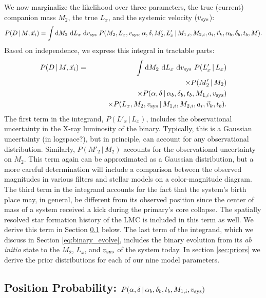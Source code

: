 \documentclass[12pt, preprint]{aastex}
\newcommand{\given}{\,|\,}
\newcommand{\dd}{\mathrm{d}}
\begin{document}
We now marginalize the likelihood over three parameters, the true (current) companion mass $M_2$, the true $L_x$, and the systemic velocity ($v_{\rm sys}$):
\begin{equation}
P(D \given M, \vec{x}_i) =  \int \dd M_2\ \dd L_x\ \dd v_{\rm sys}\ P( M_2, L_x, v_{\rm sys}, \alpha, \delta, M'_2, L'_x \given M_{1,i}, M_{2,i}, a_i, \vec{v}_k, \alpha_b, \delta_b, t_b, M).
\end{equation}
Based on independence, we express this integral in tractable parts:
\begin{eqnarray}
P(D \given M, \vec{x}_i) &=&  \int \dd M_2\ \dd L_x\ \dd v_{\rm sys}\ P(L'_x \given L_x) \nonumber \\
	& & \qquad \times P(M'_2 \given M_2) \nonumber \\
	& & \qquad \times P(\alpha, \delta \given \alpha_b, \delta_b, t_b, M_{1,i}, v_{\rm sys}) \nonumber \\
	& & \qquad \times P(L_x, M_2, v_{\rm sys} \given M_{1,i}, M_{2,i}, a_i, \vec{v}_k, t_b). \label{eq:marginalized}
\end{eqnarray}
The first term in the integrand, $P(L'_x \given L_x)$, includes the observational uncertainty in the X-ray luminosity of the binary. Typically, this is a Gaussian uncertainty (in logspace?), but in principle, can account for any observational distribution. Similarly, $P(M'_2 \given M_2)$ accounts for the observational uncertainty on $M_2$. This term again can be approximated as a Gaussian distribution, but a more careful determination will include a comparison between the observed magnitudes in various filters and stellar models on a color-magnitude diagram. The third term in the integrand accounts for the fact that the system's birth place may, in general, be different from its observed position since the center of mass of a system received a kick during the primary's core collapse. The spatially resolved star formation history of the LMC is included in this term as well. We derive this term in Section \ref{sec:ra_dec} below. The last term of the integrand, which we discuss in Section \ref{eq:binary_evolve}, includes the binary evolution from its {\it ab initio} state to the $M_2$, $L_x$, and $v_{\rm sys}$ of the system today. In section \ref{sec:priors} we derive the prior distributions for each of our nine model parameters.



\subsection{Position Probability: $P( \alpha, \delta \given \alpha_b, \delta_b, t_b, M_{1,i}, v_{\rm sys} )$} \label{sec:ra_dec}
\end{document}
